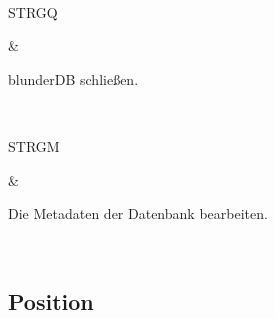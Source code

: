 \documentclass[letterpaper,10pt,german]{sphinxmanual}
\begin{document}
\begin{savenotes}
\begin{tabular}[t]{}
\\
\sphinxhline\begin{varwidth}[t]{}
\sphinxAtStartPar
STRG\sphinxhyphen{}Q
\sphinxbeforeendvarwidth
\end{varwidth}%
&\begin{varwidth}[t]{}
\sphinxAtStartPar
blunderDB schließen.
\sphinxbeforeendvarwidth
\end{varwidth}%
\\
\sphinxhline\begin{varwidth}[t]{}
\sphinxAtStartPar
STRG\sphinxhyphen{}M
\sphinxbeforeendvarwidth
\end{varwidth}%
&\begin{varwidth}[t]{}
\sphinxAtStartPar
Die Metadaten der Datenbank bearbeiten.
\sphinxbeforeendvarwidth
\end{varwidth}%
\\
\sphinxbottomrule
\end{tabular}
\sphinxtableafterendhook\par
\sphinxattableend\end{savenotes}


\subsection{Position}
\label{\detokenize{raccourcis:position}}\label{\detokenize{raccourcis:raccourcis-position}}
\end{document}
